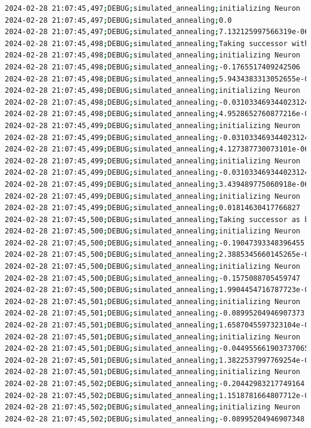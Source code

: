 \documentclass{article}
\begin{document}
\begin{lstlisting}[language=bash, caption=Example Output of Program]
2024-02-28 21:07:45,497;DEBUG;simulated_annealing;initializing Neuron
2024-02-28 21:07:45,497;DEBUG;simulated_annealing;0.0
2024-02-28 21:07:45,497;DEBUG;simulated_annealing;7.132125997566319e-06
2024-02-28 21:07:45,498;DEBUG;simulated_annealing;Taking successor with probability 100% (exploration)
2024-02-28 21:07:45,498;DEBUG;simulated_annealing;initializing Neuron
2024-02-28 21:07:45,498;DEBUG;simulated_annealing;-0.1765517409242506
2024-02-28 21:07:45,498;DEBUG;simulated_annealing;5.9434383313052655e-06
2024-02-28 21:07:45,498;DEBUG;simulated_annealing;initializing Neuron
2024-02-28 21:07:45,498;DEBUG;simulated_annealing;-0.031033469344023124
2024-02-28 21:07:45,498;DEBUG;simulated_annealing;4.9528652760877216e-06
2024-02-28 21:07:45,499;DEBUG;simulated_annealing;initializing Neuron
2024-02-28 21:07:45,499;DEBUG;simulated_annealing;-0.031033469344023124
2024-02-28 21:07:45,499;DEBUG;simulated_annealing;4.127387730073101e-06
2024-02-28 21:07:45,499;DEBUG;simulated_annealing;initializing Neuron
2024-02-28 21:07:45,499;DEBUG;simulated_annealing;-0.031033469344023124
2024-02-28 21:07:45,499;DEBUG;simulated_annealing;3.439489775060918e-06
2024-02-28 21:07:45,499;DEBUG;simulated_annealing;initializing Neuron
2024-02-28 21:07:45,499;DEBUG;simulated_annealing;0.01814630417766827
2024-02-28 21:07:45,500;DEBUG;simulated_annealing;Taking successor as better option (exploitation)
2024-02-28 21:07:45,500;DEBUG;simulated_annealing;initializing Neuron
2024-02-28 21:07:45,500;DEBUG;simulated_annealing;-0.19047393348396455
2024-02-28 21:07:45,500;DEBUG;simulated_annealing;2.3885345660145265e-06
2024-02-28 21:07:45,500;DEBUG;simulated_annealing;initializing Neuron
2024-02-28 21:07:45,500;DEBUG;simulated_annealing;-0.1575088705459747
2024-02-28 21:07:45,500;DEBUG;simulated_annealing;1.9904454716787723e-06
2024-02-28 21:07:45,501;DEBUG;simulated_annealing;initializing Neuron
2024-02-28 21:07:45,501;DEBUG;simulated_annealing;-0.08995204946907373
2024-02-28 21:07:45,501;DEBUG;simulated_annealing;1.6587045597323104e-06
2024-02-28 21:07:45,501;DEBUG;simulated_annealing;initializing Neuron
2024-02-28 21:07:45,501;DEBUG;simulated_annealing;-0.044955661903737065
2024-02-28 21:07:45,501;DEBUG;simulated_annealing;1.3822537997769254e-06
2024-02-28 21:07:45,501;DEBUG;simulated_annealing;initializing Neuron
2024-02-28 21:07:45,502;DEBUG;simulated_annealing;-0.20442983217749164
2024-02-28 21:07:45,502;DEBUG;simulated_annealing;1.1518781664807712e-06
2024-02-28 21:07:45,502;DEBUG;simulated_annealing;initializing Neuron
2024-02-28 21:07:45,502;DEBUG;simulated_annealing;-0.08995204946907348

\end{lstlisting}
\end{document}
